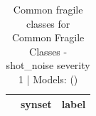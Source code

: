 \begin{table}
\caption{Common fragile classes for Common Fragile Classes - shot_noise severity 1 | Models: ()}
\label{tab:Common Fragile Classes - shot_noise severity 1_d41d8cd9}
\begin{tabular}{cll}
\toprule
 & synset & label \\
\midrule
\bottomrule
\end{tabular}
\end{table}
